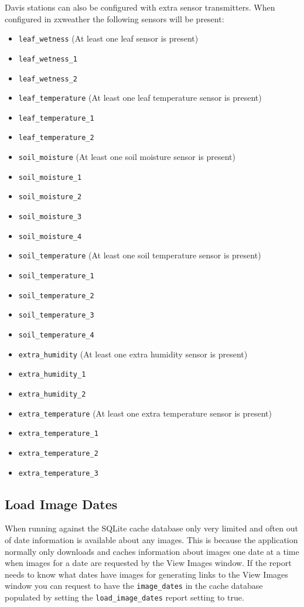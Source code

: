 \documentclass[a4paper,10pt]{book}
\begin{document}
Davis stations can also be configured with extra sensor transmitters. When configured in zxweather the following sensors will be present:
\begin{itemize}

\item \verb|leaf_wetness| (At least one leaf sensor is present)
\item \verb|leaf_wetness_1|
\item \verb|leaf_wetness_2|

\item \verb|leaf_temperature| (At least one leaf temperature sensor is present)
\item \verb|leaf_temperature_1|
\item \verb|leaf_temperature_2|

\item \verb|soil_moisture| (At least one soil moisture sensor is present)
\item \verb|soil_moisture_1|
\item \verb|soil_moisture_2|
\item \verb|soil_moisture_3|
\item \verb|soil_moisture_4|

\item \verb|soil_temperature| (At least one soil temperature sensor is present)
\item \verb|soil_temperature_1|
\item \verb|soil_temperature_2|
\item \verb|soil_temperature_3|
\item \verb|soil_temperature_4|

\item \verb|extra_humidity| (At least one extra humidity sensor is present)
\item \verb|extra_humidity_1|
\item \verb|extra_humidity_2|

\item \verb|extra_temperature| (At least one extra temperature sensor is present)
\item \verb|extra_temperature_1|
\item \verb|extra_temperature_2|
\item \verb|extra_temperature_3|
\end{itemize}



\subsection{Load Image Dates}
When running against the SQLite cache database only very limited and often out of date information is available about any images. This is because the application normally only downloads and caches information about images one date at a time when images for a date are requested by the View Images window. If the report needs to know what dates have images for generating links to the View Images window you can request to have the \verb|image_dates| in the cache database populated by setting the \verb|load_image_dates| report setting to true.
\end{document}
